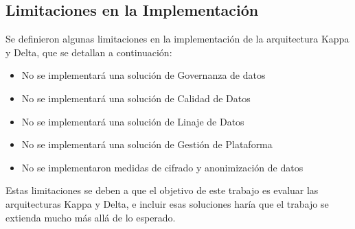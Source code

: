\newpage

\subsection{Limitaciones en la Implementación}

Se definieron algunas limitaciones en la implementación de la arquitectura Kappa y Delta, que se detallan a continuación:
\begin{itemize}
    \item No se implementará una solución de Governanza de datos
    \item No se implementará una solución de Calidad de Datos
    \item No se implementará una solución de Linaje de Datos
    \item No se implementará una solución de Gestión de Plataforma
    \item No se implementaron medidas de cifrado y anonimización de datos
\end{itemize}

Estas limitaciones se deben a que el objetivo de este trabajo es evaluar las arquitecturas Kappa y Delta,
e incluir esas soluciones haría que el trabajo se extienda mucho más allá de lo esperado.